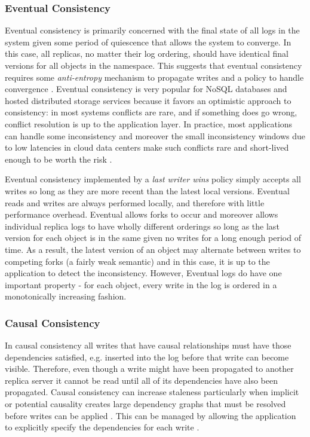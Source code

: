 \documentclass{article}
\begin{document}
\subsubsection{Eventual Consistency}

Eventual consistency is primarily concerned with the final state of all logs in the system given some period of quiescence that allows the system to converge. In this case, all replicas, no matter their log ordering, should have identical final versions for all objects in the namespace. This suggests that eventual consistency requires some \textit{anti-entropy} mechanism to propagate writes and a policy to handle convergence \cite{terry_managing_1995}. Eventual consistency is very popular for NoSQL databases and hosted distributed storage services \cite{decandia_dynamo:_2007,lakshman_cassandra:_2010} because it favors an optimistic approach to consistency: in most systems conflicts are rare, and if something does go wrong, conflict resolution is up to the application layer. In practice, most applications can handle some inconsistency and moreover the small inconsistency windows due to low latencies in cloud data centers make such conflicts rare and short-lived enough to be worth the risk \cite{bailis_quantifying_2014}.

Eventual consistency implemented by a \textit{last writer wins} policy simply accepts all writes so long as they are more recent than the latest local versions. Eventual reads and writes are always performed locally, and therefore with little performance overhead. Eventual allows forks to occur and moreover allows individual replica logs to have wholly different orderings so long as the last version for each object is in the same given no writes for a long enough period of time. As a result, the latest version of an object may alternate between writes to competing forks (a fairly weak semantic) and in this case, it is up to the application to detect the inconsistency. However, Eventual logs do have one important property - for each object, every write in the log is ordered in a monotonically increasing fashion.

\subsubsection{Causal Consistency}

In causal consistency all writes that have causal relationships must have those dependencies satisfied, e.g. inserted into the log before that write can become visible. Therefore, even though a write might have been propagated to another replica server it cannot be read until all of its dependencies have also been propagated. Causal consistency can increase staleness particularly when implicit or potential causality creates large dependency graphs that must be resolved before writes can be applied \cite{lloyd_dont_2011}. This can be managed by allowing the application to explicitly specify the dependencies for each write \cite{bailis_potential_2012}.
\end{document}
